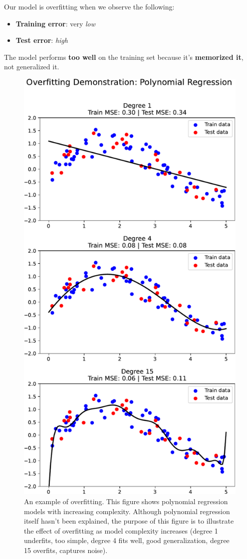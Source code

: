 \noindent
Our model is overfitting when we observe the following:
\begin{itemize}
    \item \textbf{Training error}: very \emph{low}
    \item \textbf{Test error}: \emph{high}
\end{itemize}
The model performs \textbf{too well} on the training set because it's \textbf{memorized it}, not generalized it.

\begin{figure}[!htp]
    \centering
    \includegraphics[width=.76\textwidth]{img/qda/overfitting.pdf}
    \caption{An example of overfitting. This figure shows polynomial regression models with increasing complexity. Although polynomial regression itself hasn't been explained, the purpose of this figure is to illustrate the effect of overfitting as model complexity increases (degree 1 underfits, too simple, degree 4 fits well, good generalization, degree 15 overfits, captures noise).}
\end{figure}

